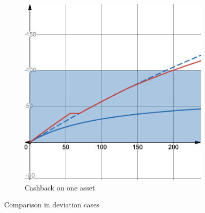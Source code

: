 \begin{figure}[h!]
\begin{subfigure}{0.4\textwidth}
		\includegraphics[width=\linewidth]{comparing_with_cfamm_deviation_one_asset.png} %
		\caption{Cashback on one asset}
		\label{fig:img5}
	\end{subfigure}
	\caption{Comparison in deviation cases}
	\label{fig:img6}
\end{figure}
\FloatBarrier

